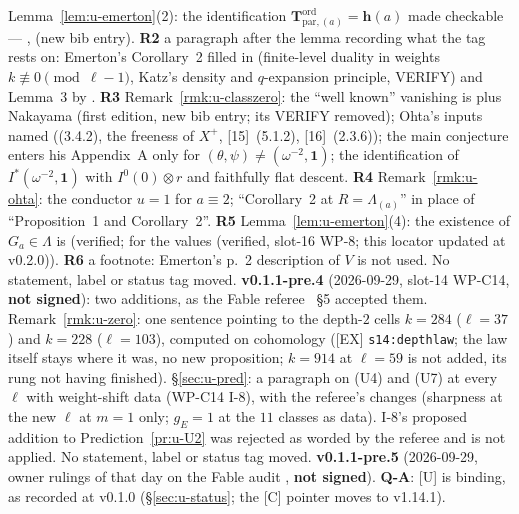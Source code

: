 \documentclass[11pt]{article}
\newcommand{\VERIFYloc}{\textsf{VERIFY}}          %
\newcommand{\Iw}{\Lambda}                         %
\newcommand{\hcusp}{\mathbf{h}}                   %
\begin{document}
Lemma~\ref{lem:u-emerton}(2): the identification $\mathbf T^{\mathrm{ord}}_{\mathrm{par},(a)}=\hcusp(a)$ made checkable --- \cite[(1.11a), (1.15a)]{hida_ens},
\cite[(1.2), (1.3), Thm.~1.3, Thm.~2.2]{hida_aif2} (new bib entry). \textbf{R2} a paragraph after the lemma recording what the tag rests on: Emerton's
Corollary~2 filled in (finite-level duality in weights $k\not\equiv0\pmod{\ell-1}$, Katz's density and $q$-expansion principle, \VERIFYloc) and Lemma~3 by
\cite[Thm.~2.2]{hida_aif2}. \textbf{R3} Remark~\ref{rmk:u-classzero}: the ``well known'' vanishing is \cite[Prop.~6.16, Prop.~13.22]{washington1st} plus Nakayama
(first edition, new bib entry; its \VERIFYloc{} removed); Ohta's inputs named ((3.4.2), the freeness of $X^{+}$, [15]~(5.1.2), [16]~(2.3.6)); the main
conjecture enters his Appendix~A only for $(\theta,\psi)\ne(\omega^{-2},\mathbf1)$; the identification of $I^{*}(\omega^{-2},\mathbf1)$ with $I^{0}(0)\otimes r$ and
faithfully flat descent. \textbf{R4} Remark~\ref{rmk:u-ohta}: the conductor $u=1$ for $a\equiv2$; ``Corollary~2 at $R=\Iw_{(a)}$'' in place of ``Proposition~1
and Corollary~2''. \textbf{R5} Lemma~\ref{lem:u-emerton}(4): the existence of $G_a\in\Iw$ is \cite[Thm.~7.10, p.~123]{washington1st} (verified; \cite[Thm.~5.11, p.~57]{washington1st} for the values (verified, slot-16 WP-8; this locator updated at v0.2.0)). \textbf{R6} a footnote: Emerton's p.~2 description of $V$ is not used. No statement, label or status tag moved.
\textbf{v0.1.1-pre.4} (2026-09-29, slot-14 WP-C14, \textbf{not signed}): two \COMP{} additions, as the Fable referee
~\S5 accepted them. Remark~\ref{rmk:u-zero}: one sentence pointing to the depth-$2$
cells $k=284$ ($\ell=37$) and $k=228$ ($\ell=103$), computed on cohomology ([EX] \texttt{s14:depthlaw}; the law itself stays where it was, no new
proposition; $k=914$ at $\ell=59$ is not added, its rung not having finished). \S\ref{sec:u-pred}: a paragraph on (U4) and (U7) at every $\ell$ with
weight-shift data (WP-C14 I-8), with the referee's changes (sharpness at the new $\ell$ at $m=1$ only; $g_E=1$ at the $11$ classes as data). I-8's
proposed addition to Prediction~\ref{pr:u-U2} was rejected as worded by the referee and is not applied. No statement, label or status tag moved.
\textbf{v0.1.1-pre.5} (2026-09-29, owner rulings of that day on the Fable audit ,
\textbf{not signed}). \textbf{Q-A}: [U] is binding, as recorded at v0.1.0 (\S\ref{sec:u-status}; the [C] pointer moves to v1.14.1).
\end{document}
